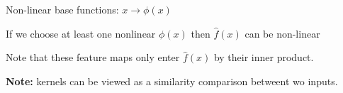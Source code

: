 Non-linear base functions: $x\rightarrow \phi(x)$

If we choose at least one nonlinear $\phi(x)$ then $\hat{f}(x)$ can be non-linear

Note that these feature maps only enter $\hat{f}(x)$ by their inner product.




\textbf{Note:} kernels can be viewed as a similarity comparison betweent wo inputs.